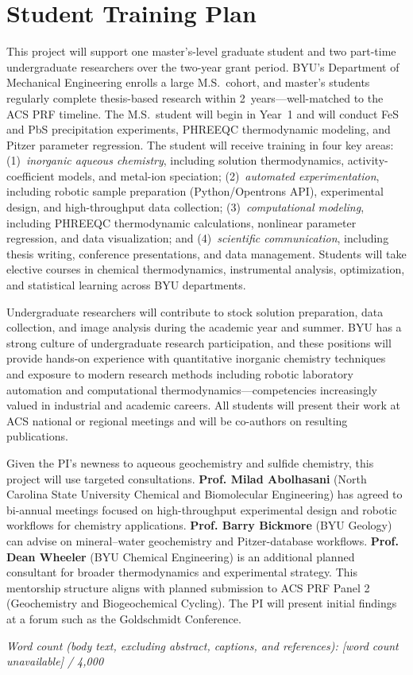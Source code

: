 \documentclass[12pt]{article}
\newcommand{\wordcount}{%
  \IfFileExists{\jobname.wordcount}%
    {\CatchFileDef{\thewordcount}{\jobname.wordcount}{\endlinechar=-1}%
     \thewordcount}%
    {[word count unavailable]}%
}
\begin{document}
\section{Student Training Plan}

This project will support one master's-level graduate student and two part-time undergraduate researchers over the two-year grant period. BYU's Department of Mechanical Engineering enrolls a large M.S.\ cohort, and master's students regularly complete thesis-based research within 2~years---well-matched to the ACS PRF timeline. The M.S.\ student will begin in Year~1 and will conduct FeS and PbS precipitation experiments, PHREEQC thermodynamic modeling, and Pitzer parameter regression. The student will receive training in four key areas: (1)~\textit{inorganic aqueous chemistry}, including solution thermodynamics, activity-coefficient models, and metal-ion speciation; (2)~\textit{automated experimentation}, including robotic sample preparation (Python/Opentrons API), experimental design, and high-throughput data collection; (3)~\textit{computational modeling}, including PHREEQC thermodynamic calculations, nonlinear parameter regression, and data visualization; and (4)~\textit{scientific communication}, including thesis writing, conference presentations, and data management. Students will take elective courses in chemical thermodynamics, instrumental analysis, optimization, and statistical learning across BYU departments.

Undergraduate researchers will contribute to stock solution preparation, data collection, and image analysis during the academic year and summer. BYU has a strong culture of undergraduate research participation, and these positions will provide hands-on experience with quantitative inorganic chemistry techniques and exposure to modern research methods including robotic laboratory automation and computational thermodynamics---competencies increasingly valued in industrial and academic careers. All students will present their work at ACS national or regional meetings and will be co-authors on resulting publications.

Given the PI's newness to aqueous geochemistry and sulfide chemistry, this project will use targeted consultations. \textbf{Prof. Milad Abolhasani} (North Carolina State University Chemical and Biomolecular Engineering) has agreed to bi-annual meetings focused on high-throughput experimental design and robotic workflows for chemistry applications. \textbf{Prof. Barry Bickmore} (BYU Geology) can advise on mineral--water geochemistry and Pitzer-database workflows. \textbf{Prof. Dean Wheeler} (BYU Chemical Engineering) is an additional planned consultant for broader thermodynamics and experimental strategy. This mentorship structure aligns with planned submission to ACS PRF Panel 2 (Geochemistry and Biogeochemical Cycling). The PI will present initial findings at a forum such as the Goldschmidt Conference.

\vspace{1em}
\noindent\textit{Word count (body text, excluding abstract, captions, and references): \wordcount{} / 4{,}000}


\begin{singlespace}


\end{singlespace}
\end{document}
